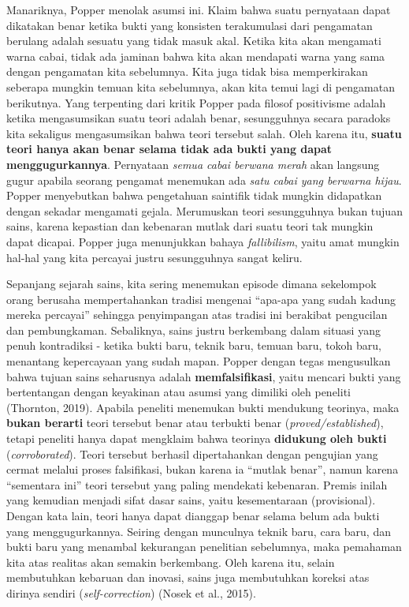 \documentclass[
  english,
  man]{apa6}
\begin{document}
Manariknya, Popper menolak asumsi ini. Klaim bahwa suatu pernyataan dapat dikatakan benar ketika bukti yang konsisten terakumulasi dari pengamatan berulang adalah sesuatu yang tidak masuk akal. Ketika kita akan mengamati warna cabai, tidak ada jaminan bahwa kita akan mendapati warna yang sama dengan pengamatan kita sebelumnya. Kita juga tidak bisa memperkirakan seberapa mungkin temuan kita sebelumnya, akan kita temui lagi di pengamatan berikutnya. Yang terpenting dari kritik Popper pada filosof positivisme adalah ketika mengasumsikan suatu teori adalah benar, sesungguhnya secara paradoks kita sekaligus mengasumsikan bahwa teori tersebut salah. Oleh karena itu, \textbf{suatu teori hanya akan benar selama tidak ada bukti yang dapat menggugurkannya}. Pernyataan \emph{semua cabai berwana merah} akan langsung gugur apabila seorang pengamat menemukan ada \emph{satu cabai yang berwarna hijau}. Popper menyebutkan bahwa pengetahuan saintifik tidak mungkin didapatkan dengan sekadar mengamati gejala. Merumuskan teori sesungguhnya bukan tujuan sains, karena kepastian dan kebenaran mutlak dari suatu teori tak mungkin dapat dicapai. Popper juga menunjukkan bahaya \emph{fallibilism}, yaitu amat mungkin hal-hal yang kita percayai justru sesungguhnya sangat keliru.

Sepanjang sejarah sains, kita sering menemukan episode dimana sekelompok orang berusaha mempertahankan tradisi mengenai \enquote{apa-apa yang sudah kadung mereka percayai} sehingga penyimpangan atas tradisi ini berakibat pengucilan dan pembungkaman. Sebaliknya, sains justru berkembang dalam situasi yang penuh kontradiksi - ketika bukti baru, teknik baru, temuan baru, tokoh baru, menantang kepercayaan yang sudah mapan. Popper dengan tegas mengusulkan bahwa tujuan sains seharusnya adalah \textbf{memfalsifikasi}, yaitu mencari bukti yang bertentangan dengan keyakinan atau asumsi yang dimiliki oleh peneliti (Thornton, 2019). Apabila peneliti menemukan bukti mendukung teorinya, maka \textbf{bukan berarti} teori tersebut benar atau terbukti benar (\emph{proved/established}), tetapi peneliti hanya dapat mengklaim bahwa teorinya \textbf{didukung oleh bukti} (\emph{corroborated}). Teori tersebut berhasil dipertahankan dengan pengujian yang cermat melalui proses falsifikasi, bukan karena ia \enquote{mutlak benar}, namun karena \enquote{sementara ini} teori tersebut yang paling mendekati kebenaran. Premis inilah yang kemudian menjadi sifat dasar sains, yaitu kesementaraan (provisional). Dengan kata lain, teori hanya dapat dianggap benar selama belum ada bukti yang menggugurkannya. Seiring dengan munculnya teknik baru, cara baru, dan bukti baru yang menambal kekurangan penelitian sebelumnya, maka pemahaman kita atas realitas akan semakin berkembang. Oleh karena itu, selain membutuhkan kebaruan dan inovasi, sains juga membutuhkan koreksi atas dirinya sendiri (\emph{self-correction}) (Nosek et al., 2015).
\end{document}

